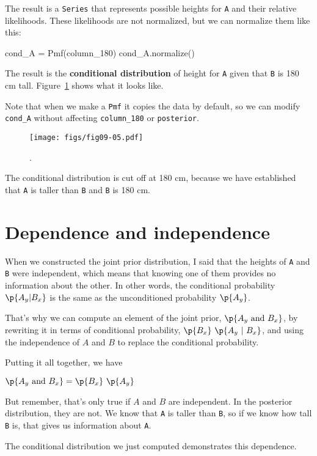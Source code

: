 \documentclass[12pt]{book}
\theoremstyle{exercise}
\newcommand{\py}[1]{{\tt #1}}%
\begin{document}
The result is a \py{Series} that represents possible heights for \py{A} and their relative likelihoods.
These likelihoods are not normalized, but we can normalize them like this:

\begin{code}
cond_A = Pmf(column_180)
cond_A.normalize()
\end{code}

The result is the {\bf conditional distribution} of height for \py{A} given that \py{B} is 180 cm tall.
Figure~\ref{fig09-05} shows what it looks like.

Note that when we make a \py{Pmf} it copies the data by default, so we can modify \py{cond_A} without affecting \py{column_180} or \py{posterior}.

\begin{figure}
\centerline{\texttt{[image: figs/fig09-05.pdf]}}
\caption{.}
\label{fig09-05}
\end{figure}

The conditional distribution is cut off at 180 cm, because we have established that \py{A} is taller than \py{B} and \py{B} is 180 cm.

\section{Dependence and independence}

When we constructed the joint prior distribution, I said that the heights of \py{A} and \py{B} were independent, which means that knowing one of them provides no information about the other.
In other words, the conditional probability $\p{A_y | B_x}$ is the same as the unconditioned probability $\p{A_y}$.

That's why we can compute an element of the joint prior, $\p{A_y~\mathrm{and}~B_x}$, by rewriting it in terms of conditional probability, $\p{B_x}~\p{A_y~|~B_x}$, and using the independence of $A$ and $B$ to replace the conditional probability.

Putting it all together, we have

$\p{A_y~\mathrm{and}~B_x} = \p{B_x}~\p{A_y}$

But remember, that's only true if $A$ and $B$ are independent.
In the posterior distribution, they are not.
We know that \py{A} is taller than \py{B}, so if we know how tall \py{B} is, that gives us information about \py{A}.

The conditional distribution we just computed demonstrates this dependence.
\end{document}
